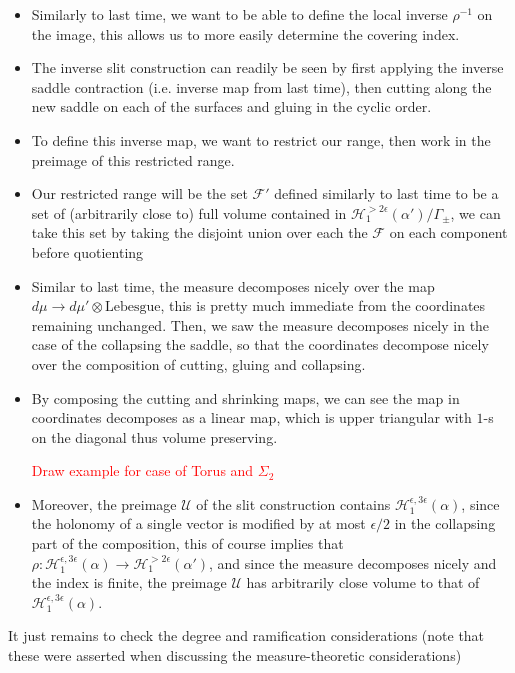 \documentclass[20pt]{article}
\theoremstyle{definition}
\begin{document}
    \begin{itemize}
        \item Similarly to last time, we want to be able to define the local inverse \(\rho^{-1}\) on the image, this allows us to more easily determine the covering index.
        \item The inverse slit construction can readily be seen by first applying the inverse saddle contraction (i.e. inverse map from last time), then cutting along the new saddle on each of the surfaces and gluing in the cyclic order.
        \item To define this inverse map, we want to restrict our range, then work in the preimage of this restricted range.
        \item Our restricted range will be the set \(\mathcal{F}'\) defined similarly to last time to be a set of (arbitrarily close to) full volume contained in \(\mathcal{H}^{>2 \epsilon}_1(\alpha')/\Gamma_{\pm}\), we can take this set by taking the disjoint union over each the \(\mathcal{F}\) on each component before quotienting
        \item Similar to last time, the measure decomposes nicely over the map \(d\mu \to d\mu' \otimes \text{Lebesgue}\), this is pretty much immediate from the coordinates remaining unchanged. Then, we saw the measure decomposes nicely in the case of the collapsing the saddle, so that the coordinates decompose nicely over the composition of cutting, gluing and collapsing.
        \item By composing the cutting and shrinking maps, we can see the map in coordinates decomposes as a linear map, which is upper triangular with \(1\)-s on the diagonal thus volume preserving.
        
        \textcolor{red}{Draw example for case of Torus and \(\Sigma_2\)}
        \item Moreover, the preimage \(\mathcal{U}\) of the slit construction contains \(\mathcal{H}^{\epsilon,3 \epsilon}_1(\alpha)\), since the holonomy of a single vector is modified by at most \(\epsilon / 2\) in the collapsing part of the composition, this of course implies that \(\rho: \mathcal{H}^{\epsilon,3 \epsilon}_1(\alpha) \to \mathcal{H}^{> 2 \epsilon}_1(\alpha')\), and since the measure decomposes nicely and the index is finite, the preimage \(\mathcal{U}\) has arbitrarily close volume to that of \(\mathcal{H}_1^{\epsilon,3 \epsilon}(\alpha)\).
    \end{itemize}

    It just remains to check the degree and ramification considerations (note that these were asserted when discussing the measure-theoretic considerations)
\end{document}
